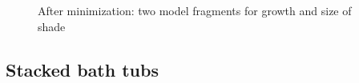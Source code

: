 \documentclass{article} %
\begin{document}
\begin{figure}[ht]
\centering
{}
\caption{After minimization: two model fragments for growth and size of shade}
\label{ts_frags}
\end{figure}

\subsection{Stacked bath tubs}
\end{document}
